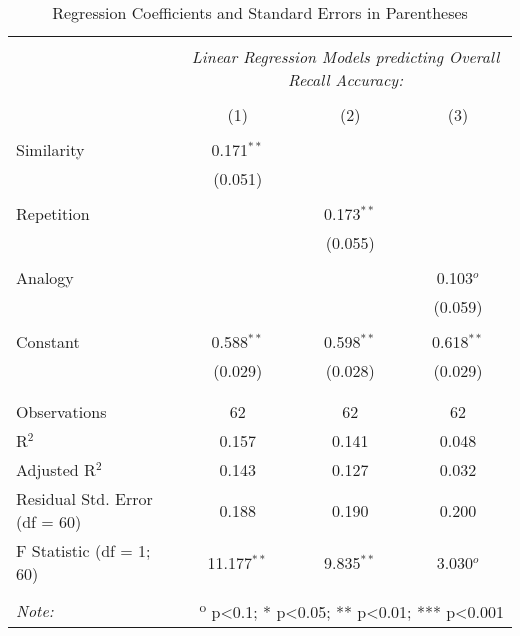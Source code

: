 
\begin{table}[!htbp] \centering
  \caption{Regression Coefficients and Standard Errors in Parentheses}
  \label{table:fol2}
  \small
  \renewcommand{\arraystretch}{0.6}
\begin{tabular}{@{\extracolsep{5pt}}lccc}
\\[-1.8ex]\hline
\hline \\[-1.8ex]
 & \multicolumn{3}{c}{\textit{Linear Regression Models predicting Overall Recall Accuracy:}} \\
\cline{2-4}
\\[-1.8ex] & (1) & (2) & (3)\\
\hline \\[-1.8ex]
 Similarity & 0.171$^{**}$ &  &  \\
  & (0.051) &  &  \\
  & & & \\
 Repetition &  & 0.173$^{**}$ &  \\
  &  & (0.055) &  \\
  & & & \\
 Analogy &  &  & 0.103$^{o}$ \\
  &  &  & (0.059) \\
  & & & \\
 Constant & 0.588$^{**}$ & 0.598$^{**}$ & 0.618$^{**}$ \\
  & (0.029) & (0.028) & (0.029) \\
  & & & \\
\hline \\[-1.8ex]
Observations & 62 & 62 & 62 \\
R$^{2}$ & 0.157 & 0.141 & 0.048 \\
Adjusted R$^{2}$ & 0.143 & 0.127 & 0.032 \\
Residual Std. Error (df = 60) & 0.188 & 0.190 & 0.200 \\
F Statistic (df = 1; 60) & 11.177$^{**}$ & 9.835$^{**}$ & 3.030$^{o}$ \\
\hline
\hline \\[-1.8ex]
\textit{Note:}  & \multicolumn{3}{r}{\textsuperscript{o} p<0.1; * p<0.05; ** p<0.01; *** p<0.001} \\
\end{tabular}
\end{table}
